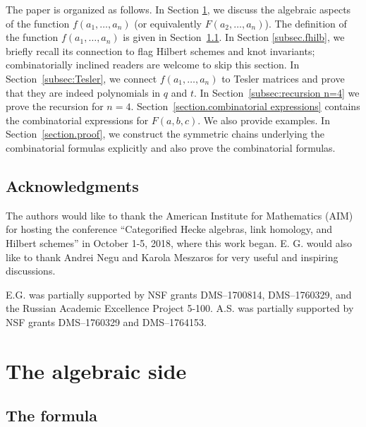 \documentclass[11pt,reqno]{amsart}
\theoremstyle{definition}
\numberwithin{equation}{section}
\begin{document}
The paper is organized as follows. In Section \ref{sec:algebraic}, we discuss the algebraic aspects of
the function $f(a_1,\ldots,a_n)$ (or equivalently $F(a_2,\ldots,a_n)$). The definition of the function $f(a_1,\ldots,a_n)$ 
is given in Section~\ref{subsection.formula}. In Section \ref{subsec.fhilb}, we briefly recall its connection to flag 
Hilbert schemes and knot invariants; combinatorially inclined readers are welcome to skip this section. In 
Section~\ref{subsec:Tesler}, we connect $f(a_1,\ldots,a_n)$ to Tesler matrices and prove that they are indeed 
polynomials in $q$ and $t$. In Section~\ref{subsec:recursion n=4} we prove the recursion for $n=4$.
Section~\ref{section.combinatorial expressions} contains the combinatorial expressions for $F(a,b,c)$. We also
provide examples. In Section~\ref{section.proof}, we construct the symmetric chains underlying the combinatorial
formulas explicitly and also prove the combinatorial formulas.

\subsection*{Acknowledgments}
The authors would like to thank the American Institute for Mathematics (AIM) for hosting the conference
``Categorified Hecke algebras, link homology, and Hilbert schemes'' in October 1-5, 2018, where this work began.
E. G. would also like to thank Andrei Negu and Karola Meszaros for very useful and inspiring discussions. 

E.G. was partially supported by NSF grants DMS--1700814, DMS--1760329, and the Russian Academic Excellence 
Project 5-100. A.S. was partially supported by NSF grants DMS--1760329 and DMS--1764153.  

\section{The algebraic side}
\label{sec:algebraic}

\subsection{The formula}
\label{subsection.formula}
\end{document}
